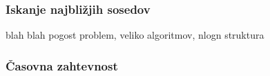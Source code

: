 \documentclass[12pt,a4paper]{article}
\theoremstyle{definition} %
\theoremstyle{plain} %
\begin{document}
\subsubsection{Iskanje najbližjih sosedov}

blah blah pogost problem, veliko algoritmov, nlogn struktura

\subsubsection{Časovna zahtevnost}

\clearpage



\end{document}
